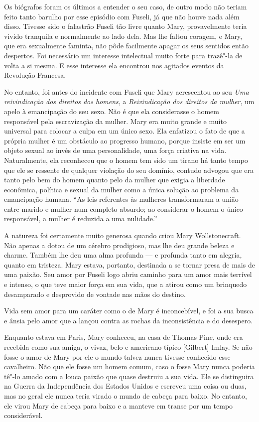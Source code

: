 Os biógrafos foram os últimos a entender o seu caso, de outro modo não
teriam feito tanto barulho por esse episódio com Fuseli, já que não
houve nada além disso. Tivesse sido o falastrão Fuseli tão livre quanto
Mary, provavelmente teria vivido tranquila e normalmente ao lado dela.
Mas lhe faltou coragem, e Mary, que era sexualmente faminta, não pôde
facilmente apagar os seus sentidos então despertos. Foi necessário um
interesse intelectual muito forte para trazê"-la de volta a si mesma. E
esse interesse ela encontrou nos agitados eventos da Revolução Francesa.

No entanto, foi antes do incidente com Fuseli que Mary acrescentou ao
seu \emph{Uma reivindicação dos direitos dos homens}, a
\emph{Reivindicação dos direitos da mulher}, um apelo à emancipação do
seu sexo. Não é que ela considerasse o homem responsável pela
escravização da mulher. Mary era muito grande e muito universal para
colocar a culpa em um único sexo. Ela enfatizou o fato de que a própria
mulher é um obstáculo ao progresso humano, porque insiste em ser um
objeto sexual ao invés de uma personalidade, uma força criativa na vida.
Naturalmente, ela reconheceu que o homem tem sido um tirano há tanto
tempo que ele se ressente de qualquer violação do seu domínio, contudo
advogou que era tanto pelo bem do homem quanto pelo da mulher que exigia
a liberdade econômica, política e sexual da mulher como a única solução
ao problema da emancipação humana. ``As leis referentes às mulheres
transformaram a união entre marido e mulher num completo absurdo; ao considerar o homem 
o único responsável, a mulher é reduzida a uma nulidade.''

A natureza foi certamente muito generosa quando criou Mary
Wollstonecraft. Não apenas a dotou de um cérebro prodigioso, mas lhe deu
grande beleza e charme. Também lhe deu uma alma profunda --- e profunda
tanto em alegria, quanto em tristeza. Mary estava, portanto, destinada a
se tornar presa de mais de uma paixão. Seu amor por Fuseli logo abriu
caminho para um amor mais terrível e intenso, o que teve maior força em
sua vida, que a atirou como um brinquedo desamparado e desprovido de
vontade nas mãos do destino.

Vida sem amor para um caráter como o de Mary é inconcebível, e foi a sua
busca e ânsia pelo amor que a lançou contra as rochas da inconsistência
e do desespero.

Enquanto estava em Paris, Mary conheceu, na casa de Thomas Pine, onde
era recebida como sua amiga, o vivaz, belo e americano típico
{[}Gilbert{]} Imlay. Se não fosse o amor de Mary por ele o mundo talvez
nunca tivesse conhecido esse cavalheiro. Não que ele fosse um homem
comum, caso o fosse Mary nunca poderia tê"-lo amado com a louca paixão
que quase destruiu a sua vida. Ele se distinguira na Guerra da
Independência dos Estados Unidos e escreveu uma coisa ou duas, mas no
geral ele nunca teria virado o mundo de cabeça para baixo. No entanto,
ele virou Mary de cabeça para baixo e a manteve em transe por um tempo
considerável.

